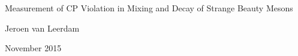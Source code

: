 \thispagestyle{empty}
\begin{center}

  \huge
  Measurement of CP Violation in Mixing and Decay of Strange Beauty Mesons\\


  \Large
  Jeroen van Leerdam


  \normalsize
  November 2015

\end{center}

\newpage
\thispagestyle{empty}
